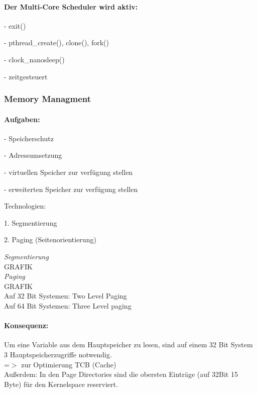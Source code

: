 \documentclass[12pt,a4paper,oneside,ngerman]{article}
\begin{document}
\paragraph{Der Multi-Core Scheduler wird aktiv:}
\begin{description}
	\item - exit()
	\item - pthread\_create(), clone(), fork()
	\item - clock\_nanosleep()
	\item - zeitgesteuert
\end{description}

\subsubsection{Memory Managment}
\paragraph{Aufgaben:}
\begin{description}
	\item - Speicherschutz
	\item - Adressumsetzung
	\item - virtuellen Speicher zur verfügung stellen
	\item - erweiterten Speicher zur verfügung stellen
\end{description}
Technologien:
\begin{description}
	\item 1. Segmentierung
	\item 2. Paging (Seitenorientierung)
\end{description}

\emph{Segmentierung}\\

GRAFIK\\

\emph{Paging}\\

GRAFIK\\

Auf 32 Bit Systemen: Two Level Paging\\
Auf 64 Bit Systemen: Three Level paging\\

\paragraph{Konsequenz:}
Um eine Variable aus dem Hauptspeicher zu lesen, sind auf einem 32 Bit System 3 Hauptspeicherzugriffe notwendig.\\
=$>$ zur Optimierung TCB (Cache)\\
Außerdem: In den Page Directories sind die obersten Einträge (auf 32Bit 15 Byte) für den Kernelspace reserviert.
\end{document}
